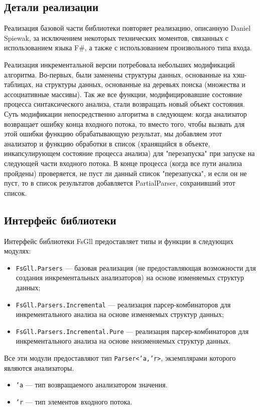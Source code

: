 \documentclass[14pt]{matmex-diploma}
\begin{document}
\subsection{Детали реализации}
Реализация базовой части библиотеки повторяет реализацию, описанную Daniel Spiewak,
за исключением некоторых технических моментов, связанных с использованием языка F\#, 
а также с использованием произвольного типа входа. 

Реализация инкрементальной версии потребовала небольших модификаций алгоритма. 
Во-первых, были заменены структуры данных, основанные на хэш-таблицах, на структуры данных,
основанные на деревьях поиска
(множества и ассоциативные массивы). Так же все функции, модифицировавшие состояние процесса синтаксического анализа, 
стали возвращать новый объект состояния. Суть модификации непосредственно алгоритма в следующем: 
когда анализатор возвращает ошибку конца входного потока, то
вместо того, чтобы вызвать для этой ошибки функцию обрабатывающую результат, мы добавляем 
этот анализатор и функцию обработки в список (хранящийся в объекте, 
инкапсулирующем состояние процесса анализа) для "перезапуска" при запуске на следующей части входного потока. 
В конце процесса (когда все пути анализа пройдены) проверяется, не пуст ли данный список 
"перезапуска", и если он не пуст, то в список результатов 
добавляется PartialParser, сохранивший этот список.



\subsection{Интерфейс библиотеки}
Интерфейс библиотеки FsGll предоставляет типы и функции в следующих модулях:
\begin{itemize}
    \item {\tt FsGll.Parsers} --- базовая реализация 
    (не предоставляющая возможности для создания инкрементальных анализаторов) на основе изменяемых структур данных;
    \item {\tt FsGll.Parsers.Incremental} --- реализация парсер-комбинаторов для 
          инкрементального анализа на основе изменяемых структур данных;
    \item {\tt FsGll.Parsers.Incremental.Pure} --- реализация парсер-комбинаторов для 
          инкрементального анализа на основе неизменяемых структур данных.
\end{itemize}

Все эти модули предоставляют тип {\tt Parser<'a,'r>}, экземплярами которого являются анализаторы.
\begin{itemize}
    \item {\tt 'a} --- тип возвращаемого анализатором значения.
    \item {\tt 'r} --- тип элементов входного потока.
\end{itemize}
\end{document}
